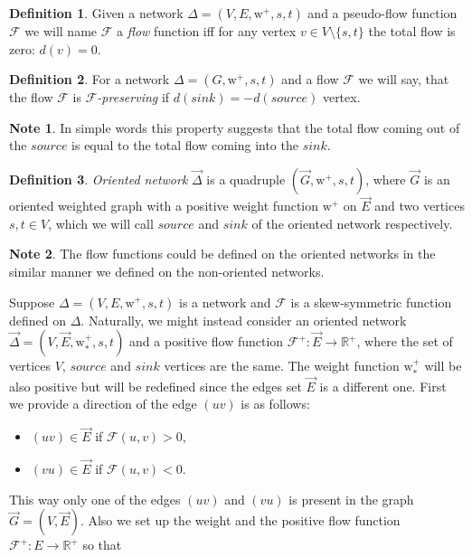 \documentclass[12pt]{article}
\theoremstyle{definition}
\newtheorem*{note}{Note}
\newtheorem{definition}{Definition}
\newcommand{\wtp}{\mathrm{w}^{+}}
\newcommand{\flow}{\mathcal{F}}
\newcommand{\flowpos}{\mathcal{F}^{+}}
\newcommand{\source}{\mathit{source}}
\newcommand{\sink}{\mathit{sink}}
\newcommand{\net}{\Delta}
\newcommand{\onet}{\vec{\Delta}}
\numberwithin{remark}{section}
\numberwithin{theorem}{section}
\numberwithin{prop}{section}
\numberwithin{equation}{section}
\numberwithin{lemma}{section}
\numberwithin{prop_under_lemma}{lemma}
\begin{document}
    \begin{definition}
      Given a network $\net = (V, E, \wtp, s, t)$ and a pseudo-flow function $\flow$ we will name $\flow$ a
        \emph{flow} function iff for any vertex $v \in V \setminus \{s,t\}$ the total flow is zero: $d(v) = 0$.
    \end{definition}
    \begin{definition}
      For a network $\net = (G, \wtp, s, t)$ and a flow $\flow$ we will say,
      that the flow $\flow$ is \emph{$\flow$-preserving} if $d(\sink) = -d(\source)$ vertex.
    \end{definition}
    \begin{note}
      In simple words this property suggests
        that the total flow coming out of the $\source$ is equal to the total flow
        coming into the $\sink$.
    \end{note}
    \begin{definition}
      \emph{Oriented network} $\onet$ is a quadruple $(\vec{G}, \wtp, s, t)$, where
        $\vec{G}$ is an oriented weighted graph with 
        a positive weight function $\wtp$ on $\vec{E}$ and two vertices $s, t \in V$, which
        we will call $\source$ and $\sink$ of the oriented network respectively.
    \end{definition}
    \begin{note}
      The flow functions could be defined on the oriented networks in the similar manner
      we defined on the non-oriented networks.
    \end{note}
    Suppose $\net = (V, E, \wtp, s, t)$ is a network and $\flow$ is a skew-symmetric function defined
    on $\net$.
    Naturally, we might instead consider an oriented network $\onet = (V, \vec{E}, \wtp_{*}, s, t)$ and a 
      positive flow function $\flowpos: \vec{E} \to \mathbb{R}^{+}$, where
      the set of vertices $V$, $\source$ and $\sink$ vertices are the same.
    The weight function $\wtp_{*}$ will be also positive but will be redefined since the edges set $\vec{E}$ is a different one.
    First we provide a direction of the edge $(uv)$ is as follows:
    \begin{itemize}
      \item $(uv) \in \vec{E}$ if $\flow(u, v) > 0$,
      \item $(vu) \in \vec{E}$ if $\flow(u, v) < 0$.
    \end{itemize}
    This way only one of the edges $(uv)$ and $(vu)$ is present in the graph $\vec{G} = (V, \vec{E})$.
    Also we set up the weight and the positive flow function $\flowpos: E \to \mathbb{R}^{+}$ so that
\end{document}

